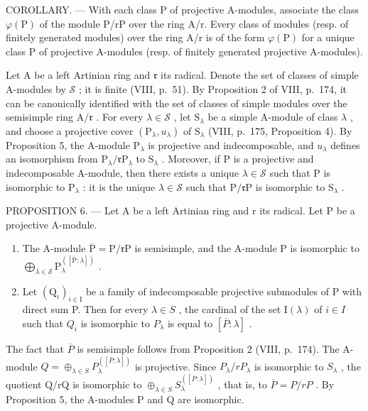 COROLLARY. --- With each class P of projective A-modules, associate the class \(\varphi(\mathrm{P})\) of the module P/rP over the ring A/r. Every class of modules (resp. of finitely generated modules) over the ring A/r is of the form \(\varphi(\mathrm{P})\) for a unique class P of projective A-modules (resp. of finitely generated projective A-modules).

Let A be a left Artinian ring and \(\mathfrak{r}\) its radical. Denote the set of classes of simple A-modules by \(\mathcal{S}\) ; it is finite (VIII, p.~51). By Proposition 2 of VIII, p.~174, it can be canonically identified with the set of classes of simple modules over the semisimple ring \(\mathrm{A} / \mathfrak{r}\) . For every \(\lambda \in \mathcal{S}\) , let \(\mathrm{S}_{\lambda}\) be a simple A-module of class \(\lambda\) , and choose a projective cover \((\mathrm{P}_{\lambda}, u_{\lambda})\) of \(\mathrm{S}_{\lambda}\) (VIII, p.~175, Proposition 4). By Proposition 5, the A-module \(\mathrm{P}_{\lambda}\) is projective and indecomposable, and \(u_{\lambda}\) defines an isomorphism from \(\mathrm{P}_{\lambda} / \mathfrak{r}\mathrm{P}_{\lambda}\) to \(\mathrm{S}_{\lambda}\) . Moreover, if P is a projective and indecomposable A-module, then there exists a unique \(\lambda \in \mathcal{S}\) such that P is isomorphic to \(\mathrm{P}_{\lambda}\) : it is the unique \(\lambda \in \mathcal{S}\) such that \(\mathrm{P} / \mathfrak{r}\mathrm{P}\) is isomorphic to \(\mathrm{S}_{\lambda}\) .

PROPOSITION 6. --- Let A be a left Artinian ring and r its radical. Let P be a projective A-module.

\begin{enumerate}
\def\labelenumi{\alph{enumi})}
\item
  The A-module \(\overline{\mathrm{P}} = \mathrm{P} / \mathfrak{r}\mathrm{P}\) is semisimple, and the A-module \(\mathrm{P}\) is isomorphic to \(\bigoplus_{\lambda \in \mathcal{S}}\mathrm{P}_{\lambda}^{([\overline{\mathrm{P}}:\lambda ])}\) .
\item
  Let \((\mathrm{Q}_{i})_{i\in\mathrm{I}}\) be a family of indecomposable projective submodules of P with direct sum P. Then for every \(\lambda\in S\) , the cardinal of the set \(\mathrm{I}(\lambda)\) of \(i\in I\) such that \(Q_{i}\) is isomorphic to \(P_{\lambda}\) is equal to \([\overline{P}:\lambda]\) .
\end{enumerate}

The fact that \(\overline{P}\) is semisimple follows from Proposition 2 (VIII, p.~174). The A-module \(Q = \oplus_{\lambda \in S} P_{\lambda}^{([\overline{P}: \lambda])}\) is projective. Since \(P_{\lambda}/rP_{\lambda}\) is isomorphic to \(S_{\lambda}\) , the quotient Q/rQ is isomorphic to \(\oplus_{\lambda \in S} S_{\lambda}^{([\overline{P}: \lambda])}\) , that is, to \(\overline{P} = P/rP\) . By Proposition 5, the A-modules P and Q are isomorphic.

